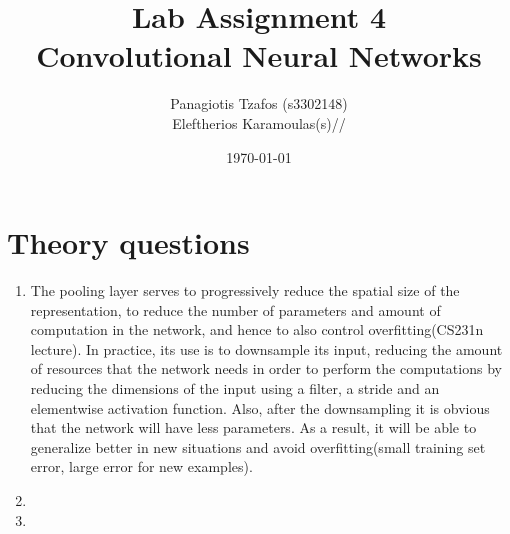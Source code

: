 \documentclass{article}
\title{Lab Assignment 4\\ {\Large Convolutional Neural Networks}}
\date{\today}
\author{
	Panagiotis Tzafos (s3302148)\\
 	Eleftherios Karamoulas(s)// 
}
\begin{document}
\maketitle
\section{Theory questions}
\begin{enumerate}
\item The pooling layer serves to progressively reduce the spatial size of the representation, to reduce the number of parameters and amount of computation in the network, and hence to also control overfitting(CS231n lecture). In practice, its use is to downsample its input, reducing the amount of resources that the network needs in order to perform the computations by reducing the dimensions of the input using a filter, a stride and an elementwise activation function. Also, after the downsampling it is obvious that the network will have less parameters. As a result, it will be able to generalize better in new situations and avoid overfitting(small training set error, large error for new examples). 
\item
\item
\end{enumerate}
\end{document}
